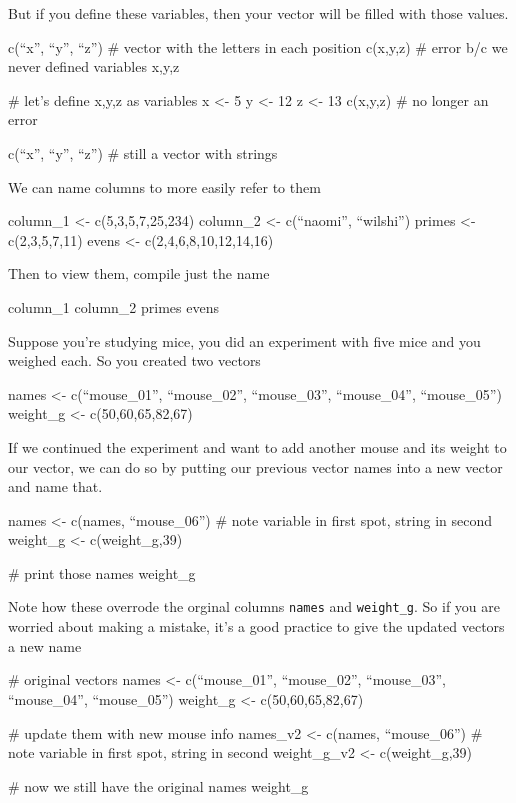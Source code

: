 But if you define these variables, then your vector will be filled
with those values.

\begin{rcode}
  c(``x'', ``y'', ``z'') # vector with the letters in each position
  c(x,y,z) # error b/c we never defined variables x,y,z

  # let's define x,y,z as variables x <- 5 y <- 12 z <- 13 c(x,y,z) #
  no longer an error

    c(``x'', ``y'', ``z'') # still a vector with strings
  \end{rcode}
    
We can name columns to more easily refer to them

\begin{rcode}
  column_1 <- c(5,3,5,7,25,234)
  column_2 <- c(``naomi'', ``wilshi'')
  primes <- c(2,3,5,7,11)
  evens <- c(2,4,6,8,10,12,14,16)
\end{rcode}

Then to view them, compile just the name

\begin{rcode}
  column_1 
  column_2 
  primes 
  evens 
\end{rcode}

Suppose you're studying mice, you did an experiment with five mice and
you weighed each. So you created two vectors

\begin{rcode}
  names <- c(``mouse_01'', ``mouse_02'', ``mouse_03'', ``mouse_04'', ``mouse_05'')
  weight_g <- c(50,60,65,82,67)
\end{rcode}

If we continued the experiment and want to add another mouse and its
weight to our vector, we can do so by putting our previous vector
names into a new vector and name that.

\begin{rcode}
  names <- c(names, ``mouse_06'') # note variable in first spot, string in second
  weight_g <- c(weight_g,39)
  
  # print those
  names
  weight_g
\end{rcode} 

Note how these overrode the orginal columns \texttt{names} and \texttt{weight\_g}.  So if you are worried about making a mistake, it's a good practice to give the updated vectors a new name

\begin{rcode}
  # original vectors
  names <- c(``mouse_01'', ``mouse_02'', ``mouse_03'', ``mouse_04'', ``mouse_05'')
  weight_g <- c(50,60,65,82,67)
  
  # update them with new mouse info    
  names_v2 <- c(names, ``mouse_06'') # note variable in first spot, string in second
  weight_g_v2 <- c(weight_g,39)
  
  # now we still have the original
  names
  weight_g
\end{rcode} 


